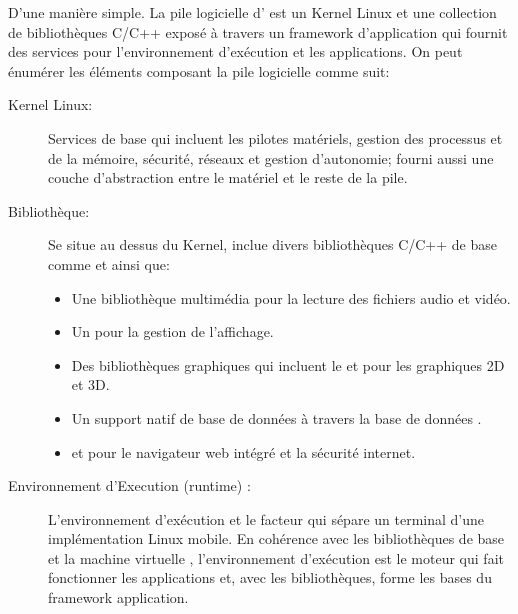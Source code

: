D'une manière simple. La pile logicielle d'\android{} est un Kernel Linux et une collection de bibliothèques C/C++ exposé à travers un framework d'application qui fournit des services pour l'environnement d'exécution et les applications. On peut énumérer les éléments composant la pile logicielle comme suit:

\begin{description}

\item [Kernel Linux:]
Services de base qui incluent les pilotes matériels, gestion des processus et de la mémoire, sécurité, réseaux et gestion d'autonomie; fourni aussi une couche d'abstraction entre le matériel et le reste de la pile.

\item [Bibliothèque:]
Se situe au dessus du Kernel, \android{} inclue divers bibliothèques C/C++ de base comme  et  ainsi que:

\begin{itemize}

\item Une bibliothèque multimédia pour la lecture des fichiers audio et vidéo.

\item Un  pour la gestion de l'affichage.

\item Des bibliothèques graphiques qui incluent le  et  pour les graphiques 2D et 3D.

\item Un support natif de base de données à travers la base de données .

\item {} et  pour le navigateur web intégré et la sécurité internet.

\end{itemize}

\item [Environnement d'Execution (runtime) \android{}:]

L'environnement d’exécution et le facteur qui sépare un terminal \android{}
d'une implémentation Linux mobile. En cohérence avec les bibliothèques de base
et la machine virtuelle , l'environnement d’exécution \android{} est
le moteur qui fait fonctionner les applications et, avec les bibliothèques,
forme les bases du framework application.

\begin{description}


\end{description}
\end{description}
